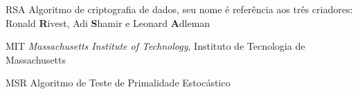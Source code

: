 \begin{siglas}
	\item[RSA]	Algoritmo de criptografia de dados, seu nome é referência aos três criadores: Ronald \textbf{R}ivest, Adi \textbf{S}hamir e Leonard \textbf{A}dleman
	\item[MIT]	\emph{Massachusetts Institute of Technology}, Instituto de Tecnologia de Massachusetts
	\item[MSR]	Algoritmo de Teste de Primalidade Estocástico 
\end{siglas}
